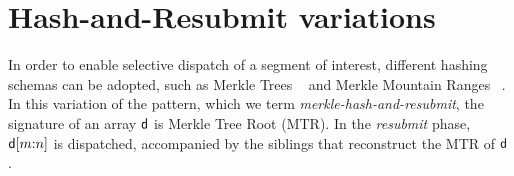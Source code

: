 \section{Hash-and-Resubmit variations}
In order to enable selective dispatch of a segment of interest, different
hashing schemas can be adopted, such as Merkle Trees ~\cite{merkle} and Merkle Mountain
Ranges ~\cite{mmr-1, mmr-2}. In this variation of the pattern, which we term
\emph{merkle-hash-and-resubmit}, the signature of an array $\mathsf{d}$ is
Merkle Tree Root (MTR). In the \emph{resubmit} phase, $\mathsf{d}[m{:}n]$ is
dispatched, accompanied by the siblings that reconstruct the MTR of
$\mathsf{d}$.

